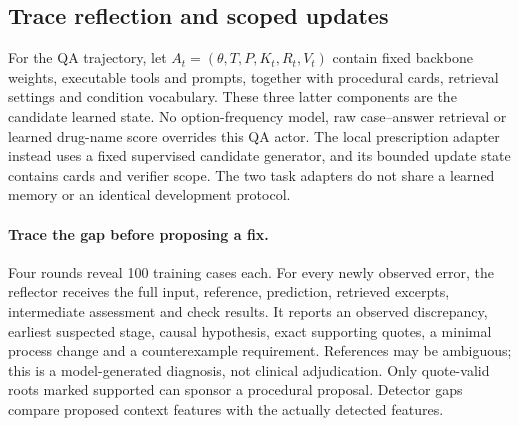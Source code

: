 \subsection{Trace reflection and scoped updates}
For the QA trajectory, let $A_t=(\theta,T,P,K_t,R_t,V_t)$ contain fixed backbone weights, executable tools and prompts, together with procedural cards, retrieval settings and condition vocabulary. These three latter components are the candidate learned state. No option-frequency model, raw case--answer retrieval or learned drug-name score overrides this QA actor. The local prescription adapter instead uses a fixed supervised candidate generator, and its bounded update state contains cards and verifier scope. The two task adapters do not share a learned memory or an identical development protocol.

\paragraph{Trace the gap before proposing a fix.}
Four rounds reveal 100 training cases each. For every newly observed error, the reflector receives the full input, reference, prediction, retrieved excerpts, intermediate assessment and check results. It reports an observed discrepancy, earliest suspected stage, causal hypothesis, exact supporting quotes, a minimal process change and a counterexample requirement. References may be ambiguous; this is a model-generated diagnosis, not clinical adjudication. Only quote-valid roots marked supported can sponsor a procedural proposal. Detector gaps compare proposed context features with the actually detected features.

